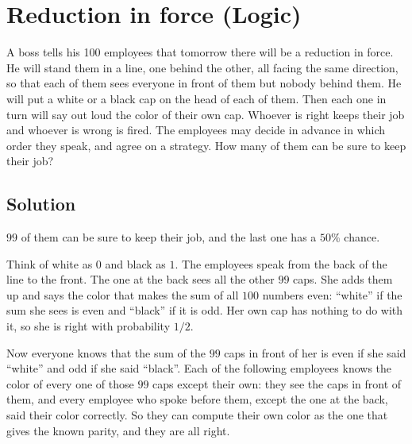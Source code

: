 \section {Reduction in force (Logic)}

A boss tells his 100 employees that tomorrow there will be a reduction in force.
He will stand them in a line, one behind the other, all facing the same direction, so that each of them sees everyone in front of them but nobody behind them.
He will put a white or a black cap on the head of each of them. Then each one in turn will say out loud the color of their own cap.
Whoever is right keeps their job and whoever is wrong is fired.
The employees may decide in advance in which order they speak, and agree on a strategy.
How many of them can be sure to keep their job?

\subsection{Solution}

$99$ of them can be sure to keep their job, and the last one has a $50\%$ chance.

Think of white as $0$ and black as $1$. The employees speak from the back of the line to the front.
The one at the back sees all the other $99$ caps. She adds them up and says the color that makes the sum of all $100$ numbers even:
``white'' if the sum she sees is even and ``black'' if it is odd. Her own cap has nothing to do with it, so she is right with probability $1/2$.

Now everyone knows that the sum of the $99$ caps in front of her is even if she said ``white'' and odd if she said ``black''.
Each of the following employees knows the color of every one of those $99$ caps except their own: they see the caps in front of them,
and every employee who spoke before them, except the one at the back, said their color correctly.
So they can compute their own color as the one that gives the known parity, and they are all right.
